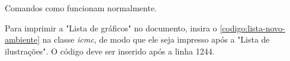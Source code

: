 Comandos como  funcionam normalmente.

Para imprimir a "Lista de gráficos" no documento, insira o \autoref{codigo:lista-novo-ambiente} na classe \textit{icmc}, de modo que ele seja impresso após a "Lista de ilustrações". O código deve ser inserido após a linha 1244.


\begin{codigo}[caption={Código para inserir lista de gráficos}, label={codigo:lista-novo-ambiente}, language=Tex, breaklines=true]
\listofgraficos*
\cleardoublepage
\end{codigo}